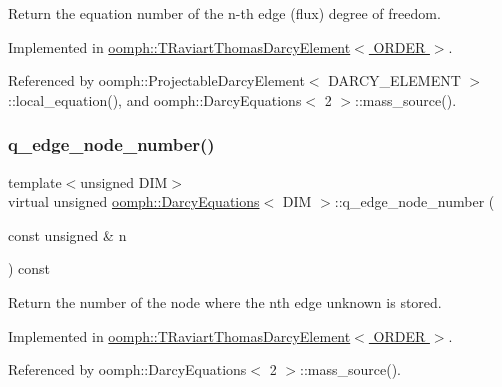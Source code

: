 Return the equation number of the n-\/th edge (flux) degree of freedom. 



Implemented in \hyperlink{classoomph_1_1TRaviartThomasDarcyElement_ac2ff2f6ee57c888dbeac1a9e7b7efc61}{oomph\+::\+T\+Raviart\+Thomas\+Darcy\+Element$<$ O\+R\+D\+E\+R $>$}.



Referenced by oomph\+::\+Projectable\+Darcy\+Element$<$ D\+A\+R\+C\+Y\+\_\+\+E\+L\+E\+M\+E\+N\+T $>$\+::local\+\_\+equation(), and oomph\+::\+Darcy\+Equations$<$ 2 $>$\+::mass\+\_\+source().

\mbox{\label{classoomph_1_1DarcyEquations_a8b16b4fef19d8a785aae3cbf59e3a7cd}} 
\subsubsection{\texorpdfstring{q\+\_\+edge\+\_\+node\+\_\+number()}{q\_edge\_node\_number()}}
{\footnotesize\ttfamily template$<$unsigned D\+IM$>$ \\
virtual unsigned \hyperlink{classoomph_1_1DarcyEquations}{oomph\+::\+Darcy\+Equations}$<$ D\+IM $>$\+::q\+\_\+edge\+\_\+node\+\_\+number (\begin{DoxyParamCaption}\item[{const unsigned \&}]{n }\end{DoxyParamCaption}) const\hspace{0.3cm}{\ttfamily [pure virtual]}}



Return the number of the node where the nth edge unknown is stored. 



Implemented in \hyperlink{classoomph_1_1TRaviartThomasDarcyElement_a81e9386364c70670d6ee4d501cc89da5}{oomph\+::\+T\+Raviart\+Thomas\+Darcy\+Element$<$ O\+R\+D\+E\+R $>$}.



Referenced by oomph\+::\+Darcy\+Equations$<$ 2 $>$\+::mass\+\_\+source().

\mbox{\label{classoomph_1_1DarcyEquations_af92e9914e062e894514cca6a7cec0a26}} 
